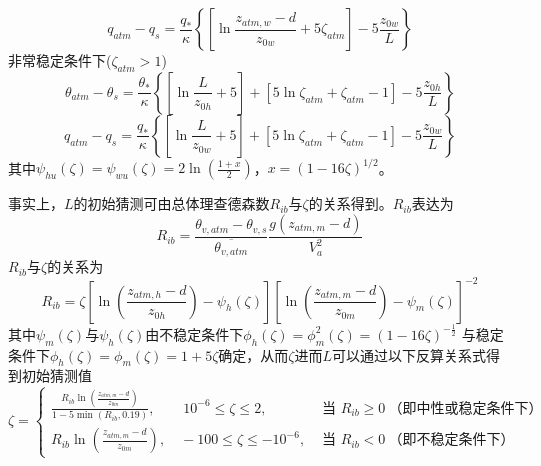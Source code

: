 \begin{equation}
q_{atm}-q_{s}=\frac{q_{*}}{\kappa}\left\{\left[\ln \frac{z_{atm, w}-d}{z_{0 w}}+5 \zeta_{atm}\right]-5 \frac{z_{0 w}}{L}\right\}
\end{equation}
非常稳定条件下($\zeta_{atm}>1$)
\begin{equation}\label{theta_VS}
\theta_{atm}-\theta_{s}=\frac{\theta_{*}}{\kappa}\left\{\left[\ln \frac{L}{z_{0 h}}+5\right]
+\left[5 \ln \zeta_{atm}+\zeta_{atm}-1\right]-5 \frac{z_{0 h}}{L}\right\}
\end{equation}
\begin{equation}\label{q_VS}
q_{atm}-q_{s}=\frac{q_{*}}{\kappa}\left\{\left[\ln \frac{L}{z_{0 w}}+5\right]
+\left[5 \ln \zeta_{atm}+\zeta_{atm}-1\right]-5 \frac{z_{0 w}}{L}\right\}
\end{equation}
其中$\psi_{hu}\left(\zeta\right)=\psi_{wu}\left(\zeta\right)=2\ln{\left(\frac{1+x}{2}\right)}$，$x={(1-16\zeta)}^{1/2}$。

事实上，$L$的初始猜测可由总体理查德森数$R_{ib}$与$\zeta$的关系得到\citep{arya2001introduction}。$R_{ib}$表达为
\begin{equation}\label{Rib}
R_{i b}=\frac{\theta_{v, atm}-\theta_{v, s}}{\overline{\theta_{v, atm}}} \frac{g\left(z_{atm, m}-d\right)}{V_{a}^{2}}
\end{equation}
$R_{ib}$与$\zeta$的关系为
\begin{equation}
R_{ib}=\zeta\left[\ln{\left(\frac{z_{atm,h}-d}{z_{0h}}\right)-\psi_h(\zeta)}\right] \left[\ln{\left(\frac{z_{atm,m}-d}{z_{0m}}\right)-\psi_m(\zeta)}\right]^{-2}
\end{equation}
其中$\psi_m(\zeta)$与$\psi_h(\zeta)$由不稳定条件下$\phi_h\left(\zeta\right)=\phi_m^2\left(\zeta\right)=\left(1-16\zeta\right)^{-\frac{1}{2}}$ 
与稳定条件下$\phi_h\left(\zeta\right)=\phi_m\left(\zeta\right)=1+5\zeta$确定，从而$\zeta$进而$L$可以通过以下反算关系式得到初始猜测值
\begin{equation}\label{ZetaRib}
  \zeta=\begin{cases}
    \frac{R_{i b} \ln \left(\frac{z_{atm, m}-d}{z_{0 m}}\right)}{1-5 \min \left(R_{i b}, 0.19\right)}, \qquad 10^{-6} \leq \zeta \leq 2, & \text{ 当 } R_{i b} \geq 0\ \text{（即中性或稳定条件下）} \\
    R_{ib} \ln \left(\frac{z_{atm, m}-d}{z_{0 m}}\right),  \quad -100 \leq \zeta \leq-10^{-6}, & \text{ 当 } R_{i b}<0\ \text{（即不稳定条件下）}
  \end{cases}
\end{equation}

